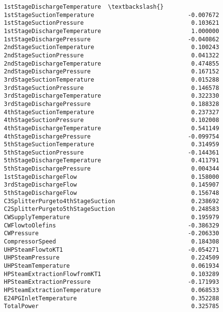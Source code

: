 \documentclass[11pt]{article}
\begin{document}
\begin{tcolorbox}[breakable, size=fbox, boxrule=.5pt, pad at break*=1mm, opacityfill=0]
\begin{Verbatim}[commandchars=\\\{\}]
                                  1stStageDischargeTemperature  \textbackslash{}
1stStageSuctionTemperature                           -0.007672
1stStageSuctionPressure                               0.103621
1stStageDischargeTemperature                          1.000000
1stStageDischargePressure                            -0.040862
2ndStageSuctionTemperature                            0.100243
2ndStageSuctionPressure                               0.041322
2ndStageDischargeTemperature                          0.474855
2ndStageDischargePressure                             0.167152
3rdStageSuctionTemperature                            0.015288
3rdStageSuctionPressure                               0.146578
3rdStageDischargeTemperature                          0.322330
3rdStageDischargePressure                             0.188328
4thStageSuctionTemperature                            0.237327
4thStageSuctionPressure                               0.102008
4thStageDischargeTemperature                          0.541149
4thStageDischargePressure                            -0.099754
5thStageSuctionTemperature                            0.314959
5thStageSuctionPressure                              -0.144361
5thStageDischargeTemperature                          0.411791
5thStageDischargePressure                             0.004344
1stStageDischargeFlow                                 0.158000
3rdStageDischargeFlow                                 0.145907
5thStageDischargeFlow                                 0.156748
C3SplitterPurgeto4thStageSuction                      0.238692
C2SplitterPurgeto5thStageSuction                      0.248583
CWSupplyTemperature                                   0.195979
CWFlowtoOlefins                                      -0.386329
CWPressure                                           -0.206330
CompressorSpeed                                       0.184308
UHPSteamFlowtoKT1                                    -0.054271
UHPSteamPressure                                      0.224509
UHPSteamTemperature                                   0.061934
HPSteamExtractionFlowfromKT1                          0.103289
HPSteamExtractionPressure                            -0.171993
HPSteamExtractionTemperature                          0.068533
E24PGInletTemperature                                 0.352288
TotalPower                                            0.325785


\end{Verbatim}
\end{tcolorbox}
\end{document}
